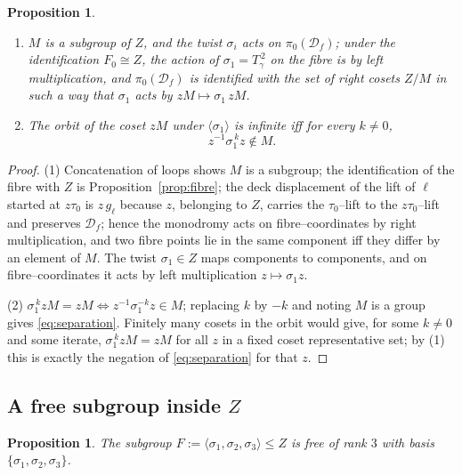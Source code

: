 \documentclass[11pt]{amsart}
\theoremstyle{plain}
\newtheorem{proposition}[theorem]{Proposition}
\theoremstyle{definition}
\newcommand{\D}{\mathcal{D}}
\begin{document}
\begin{proposition}\label{prop:cosets}
\begin{enumerate}
\item $M$ is a subgroup of $Z$, and the twist $\sigma_i$ acts on
$\pi_0(\D_f)$; under the identification $F_0\cong Z$, the action of
$\sigma_1=T_\gamma^{\,2}$ on the fibre is by left multiplication, and
$\pi_0(\D_f)$ is identified with the set of right cosets $Z/M$ in such a
way that $\sigma_1$ acts by $zM\mapsto \sigma_1\,zM$.
\item The orbit of the coset $zM$ under $\langle\sigma_1\rangle$ is
infinite iff for every $k\ne0$,
\begin{equation}\label{eq:separation}
z^{-1}\sigma_1^{\,k}z\notin M .
\end{equation}
\end{enumerate}
\end{proposition}

\begin{proof}
(1) Concatenation of loops shows $M$ is a subgroup; the identification of
the fibre with $Z$ is Proposition~\ref{prop:fibre}; the deck displacement
of the lift of $\ell$ started at $z\tau_0$ is $z\,g_\ell$ because $z$,
belonging to $Z$, carries the $\tau_0$--lift to the $z\tau_0$--lift and
preserves $\D_f$; hence the monodromy acts on fibre--coordinates by right
multiplication, and two fibre points lie in the same component iff they
differ by an element of $M$.  The twist $\sigma_1\in Z$ maps components to
components, and on fibre--coordinates it acts by left multiplication
$z\mapsto\sigma_1z$.

(2) $\sigma_1^{\,k}zM=zM\iff z^{-1}\sigma_1^{-k}z\in M$; replacing $k$ by
$-k$ and noting $M$ is a group gives \eqref{eq:separation}.  Finitely many
cosets in the orbit would give, for some $k\ne0$ and some iterate,
$\sigma_1^{\,k}zM=zM$ for all $z$ in a fixed coset representative set;
by (1) this is exactly the negation of \eqref{eq:separation} for that $z$.
\end{proof}

\subsection{A free subgroup inside \texorpdfstring{$Z$}{Z}}

\begin{proposition}\label{prop:free}
The subgroup $F:=\langle\sigma_1,\sigma_2,\sigma_3\rangle\le Z$ is free of
rank $3$ with basis $\{\sigma_1,\sigma_2,\sigma_3\}$.
\end{proposition}
\end{document}
